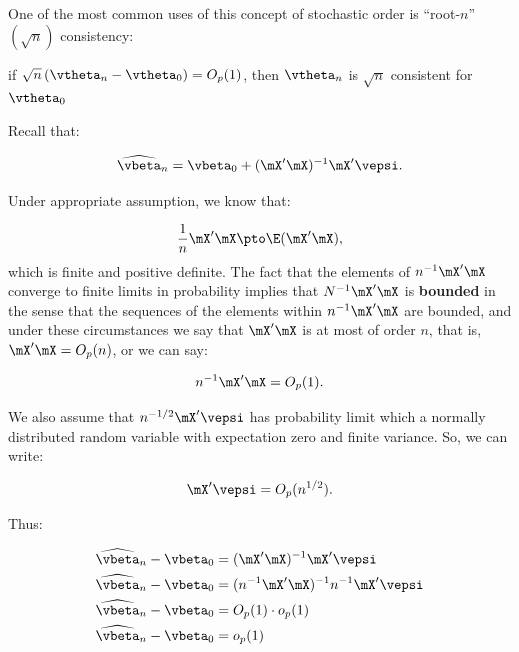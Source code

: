 \documentclass[english,12pt]{book}\usepackage[]{graphicx}\usepackage[]{xcolor}
\begin{document}
One of the most common uses of this concept of stochastic order is ``root-$n$'' $(\sqrt{n})$ consistency:

\begin{definition}
		if $\sqrt{n}\left(\vtheta_n - \vtheta_0\right)= O_p(1)$, then $\vtheta_n$ is $\sqrt{n}$ consistent for $\vtheta_0$
\end{definition}

\begin{example}
Recall that:

\begin{equation*}
  \widehat{\vbeta}_n = \vbeta_0 + (\mX'\mX)^{-1}\mX'\vepsi.
\end{equation*}

Under appropriate assumption, we know that:

\begin{equation*}
  \frac{1}{n}\mX'\mX\pto \E(\mX'\mX),
\end{equation*}
%
which is finite and positive definite. The fact that the elements of $n^{-1}\mX'\mX$ converge to finite limits in probability implies that $N^{-1}\mX'\mX$ is \textbf{bounded} in the sense that the sequences of the elements within $n^{-1}\mX'\mX$ are bounded, and under these circumstances we say that $\mX'\mX$ is at most of order $n$, that is, $\mX'\mX = O_p(n)$, or we can say:

\begin{equation*}
n^{-1}\mX'\mX = O_p(1).
\end{equation*}

We also assume that $n^{-1/2} \mX'\vepsi$ has probability limit which a normally distributed random variable with expectation zero and finite variance. So, we can write:

\begin{equation*}
\mX'\vepsi = O_p(n^{1/2}).
\end{equation*}

Thus:


\begin{equation*}
  \begin{aligned}
\widehat{\vbeta}_n - \vbeta_0 & =  (\mX'\mX)^{-1}\mX'\vepsi  \\
\widehat{\vbeta}_n - \vbeta_0 & =  (n^{-1}\mX'\mX)^{-1}n^{-1}\mX'\vepsi  \\
\widehat{\vbeta}_n - \vbeta_0 & = O_p(1) \cdot o_p(1) \\
\widehat{\vbeta}_n - \vbeta_0 & = o_p(1)
\end{aligned}
\end{equation*}


\end{example}
\end{document}
